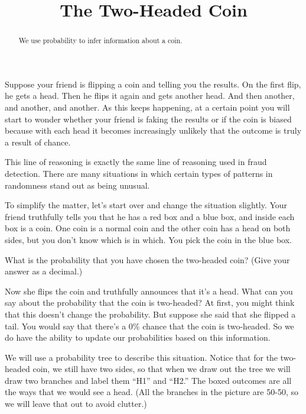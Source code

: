 \documentclass{ximera}
\title{The Two-Headed Coin}
\begin{document}
\begin{abstract}
We use probability to infer information about a coin.
\end{abstract}
\maketitle

Suppose your friend is flipping a coin and telling you the results. On the first flip, he gets a head. Then he flips it again and gets another head. And then another, and another, and another. As this keeps happening, at a certain point you will start to wonder whether your friend is faking the results or if the coin is biased because with each head it becomes increasingly unlikely that the outcome is truly a result of chance.

This line of reasoning is exactly the same line of reasoning used in fraud detection. There are many situations in which certain types of patterns in randomness stand out as being unusual.

To simplify the matter, let's start over and change the situation slightly. Your friend truthfully tells you that he has a red box and a blue box, and inside each box is a coin. One coin is a normal coin and the other coin has a head on both sides, but you don't know which is in which. You pick the coin in the blue box.

\begin{question}
What is the probability that you have chosen the two-headed coin? (Give your answer as a decimal.)
  \begin{solution}
  \end{solution}
\end{question}

Now she flips the coin and truthfully announces that it's a head. What can you say about the probability that the coin is two-headed? At first, you might think that this doesn't change the probability. But suppose she said that she flipped a tail. You would say that there's a 0\% chance that the coin is two-headed. So we do have the ability to update our probabilities based on this information.

We will use a probability tree to describe this situation. Notice that for the two-headed coin, we still have two sides, so that when we draw out the tree we will draw two branches and label them ``H1'' and ``H2.'' The boxed outcomes are all the ways that we would see a head. (All the branches in the picture are 50-50, so we will leave that out to avoid clutter.)
\end{document}
